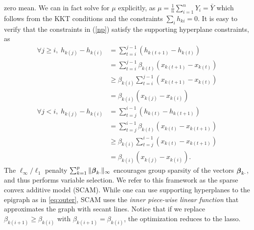 zero mean. We can in fact solve for $\mu$ explicitly, as  
$\mu = \frac{1}{n} \sum_{i=1}^n Y_i = \bar{Y}$ which follows from the
KKT conditions
and the constraints $\sum_i h_{ki} = 0$.
It is easy to verify that the constraints in (\ref{np}) satisfy the supporting hyperplane constraints, as
\begin{align*}
  \forall j\geq{}i,\; h_{k(j)}-h_{k(i)}  &= 
            \sum\limits_{t=i}^{j-1}(h_{k(t+1)}-h_{k(t)}) \\
      & = \sum\limits_{t=i}^{j-1}\beta_{k(t)}(x_{k(t+1)}-x_{k(t)})\\ 
      & \geq \beta_{k(i)}\sum\limits_{t=i}^{j-1}(x_{k(t+1)}-x_{k(t)}) \\
      & = \beta_{k(i)}(x_{k(j)}-x_{k(i)}) \\
  \forall j<i,\;  h_{k(j)}-h_{k(i)} &=
                \sum\limits_{t=j}^{i-1}(h_{k(t)}-h_{k(t+1)}) \\
     &= \sum\limits_{t=j}^{i-1}\beta_{k(t)}(x_{k(t)}-x_{k(t+1)}) \\ 
     & \geq \beta_{k(i)}\sum\limits_{t=j}^{i-1}(x_{k(t)}-x_{k(t+1)})  \\
     &= \beta_{k(i)}(x_{k(j)}-x_{k(i)}).
\end{align*}
The $\ell_\infty/\ell_1$ penalty
$\sum_{k=1}^{p}\|\boldsymbol{\beta}_{k\cdot}\|_{\infty}$ encourages group
sparsity of the vectors $\boldsymbol{\beta}_{k\cdot}$, and thus performs
variable selection.  We refer to this framework as the sparse convex
additive model (SCAM). While one can use
supporting hyperplanes to the epigraph as in \eqref{eq:outer}, 
SCAM uses the \emph{inner  piece-wise linear function}
that approximates the graph with secant lines. Notice that if we replace $\beta_{k(i+1)} \geq
\beta_{k(i)}$ with $\beta_{k(i+1)}=\beta_{k(i)}$, the optimization
reduces to the lasso.  



